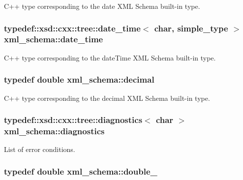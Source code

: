 C++ type corresponding to the date X\-M\-L Schema built-\/in type. 

\hypertarget{namespacexml__schema_a94af98c4870fb2715706678639c97224}{
\subsubsection[{date\-\_\-time}]{\setlength{\rightskip}{0pt plus 5cm}typedef\-::xsd\-::cxx\-::tree\-::date\-\_\-time$<$ char, {\bf simple\-\_\-type} $>$ {\bf xml\-\_\-schema\-::date\-\_\-time}}}\label{namespacexml__schema_a94af98c4870fb2715706678639c97224}


C++ type corresponding to the date\-Time X\-M\-L Schema built-\/in type. 

\hypertarget{namespacexml__schema_a69bfaf24f63a8c18ebd8e21db6b343df}{
\subsubsection[{decimal}]{\setlength{\rightskip}{0pt plus 5cm}typedef double {\bf xml\-\_\-schema\-::decimal}}}\label{namespacexml__schema_a69bfaf24f63a8c18ebd8e21db6b343df}


C++ type corresponding to the decimal X\-M\-L Schema built-\/in type. 

\hypertarget{namespacexml__schema_a0d9a5a38c30964872464e338625301d8}{
\subsubsection[{diagnostics}]{\setlength{\rightskip}{0pt plus 5cm}typedef\-::xsd\-::cxx\-::tree\-::diagnostics$<$ char $>$ {\bf xml\-\_\-schema\-::diagnostics}}}\label{namespacexml__schema_a0d9a5a38c30964872464e338625301d8}


List of error conditions. 

\hypertarget{namespacexml__schema_aac2d3d3483d3a20e8d96d2e8e5b3a470}{
\subsubsection[{double\-\_\-}]{\setlength{\rightskip}{0pt plus 5cm}typedef double {\bf xml\-\_\-schema\-::double\-\_\-}}}\label{namespacexml__schema_aac2d3d3483d3a20e8d96d2e8e5b3a470}



